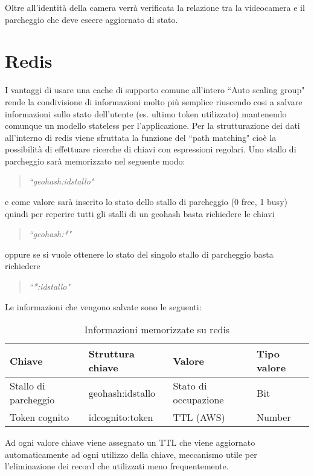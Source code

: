 Oltre all'identità della camera verrà verificata la relazione tra la videocamera e il parcheggio che deve eseere aggiornato di stato.






\section{Redis}
I vantaggi di usare una cache di supporto comune all'intero ``Auto scaling group" rende la condivisione di informazioni molto più semplice riuscendo cosi a salvare informazioni sullo stato dell'utente (es. ultimo token utilizzato) mantenendo comunque un modello stateless per l'applicazione. Per la strutturazione dei dati all'interno di redis viene sfruttata la funzione del ``path matching" cioè la possibilità di effettuare ricerche di chiavi con espressioni regolari. Uno stallo di parcheggio sarà memorizzato nel seguente modo:
\begin{quotation}
\textit{``geohash:idstallo"}
\end{quotation}
 e come valore sarà inserito lo stato dello stallo di parcheggio (0 free, 1 busy)
quindi per reperire tutti gli stalli di un geohash basta richiedere le chiavi 
\begin{quotation}
\textit{``geohash:*"}
\end{quotation}
 oppure  se si vuole ottenere lo stato del singolo stallo di parcheggio basta richiedere 
\begin{quotation}
\textit{``*:idstallo"}
\end{quotation} 
Le informazioni che vengono salvate sono le seguenti:

\begin{table}[htb]
\centering
\caption{Informazioni memorizzate su redis}
\label{my-label}
\begin{tabular}{|l|l|l|l|}
\hline
Chiave               & Struttura chiave & Valore               & Tipo valore \\ \hline
Stallo di parcheggio & geohash:idstallo & Stato di occupazione & Bit         \\ \hline
Token cognito        & idcognito:token  & TTL (AWS)                 & Number      \\ \hline
\end{tabular}
\end{table}

Ad ogni valore chiave viene assegnato un TTL che viene aggiornato automaticamente ad ogni utilizzo della chiave, meccanismo utile per l'eliminazione dei record che utilizzati meno frequentemente.

